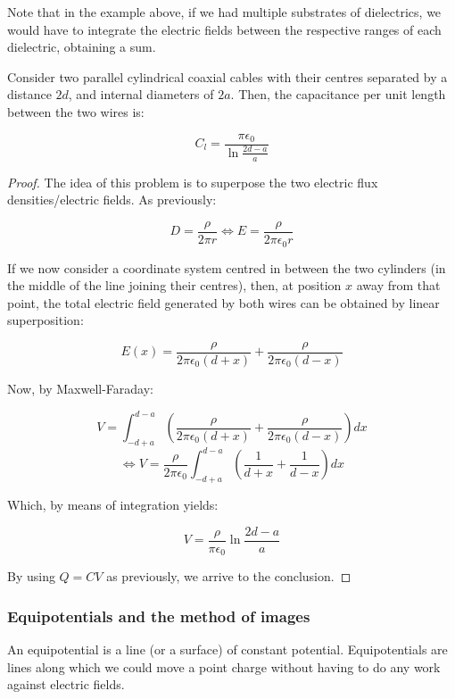 \documentclass{article}
\begin{document}
Note that in the example above, if we had multiple substrates of dielectrics, we would have to integrate the electric fields between the respective ranges of each dielectric, obtaining a sum.

\begin{proposition}
    Consider two parallel cylindrical coaxial cables with their centres separated by a distance $2d$, and internal diameters of $2a$. Then, the capacitance per unit length between the two wires is:

    \[ C_l = \frac{\pi\epsilon_0}{\ln{\frac{2d - a}{a}}} \]
\end{proposition}

\begin{proof}
    The idea of this problem is to superpose the two electric flux densities/electric fields. As previously:

    \[ D = \frac{\rho}{2\pi r} \iff E = \frac{\rho}{2\pi\epsilon_0 r} \]

    If we now consider a coordinate system centred in between the two cylinders (in the middle of the line joining their centres), then, at position $x$ away from that point, the total electric field generated by both wires can be obtained by linear superposition:

    \[ E(x) = \frac{\rho}{2\pi\epsilon_0(d+x)} + \frac{\rho}{2\pi\epsilon_0(d - x)} \]

    Now, by Maxwell-Faraday:

    \[ V = \int_{-d + a}^{d - a} \left(\frac{\rho}{2\pi\epsilon_0(d+x)} + \frac{\rho}{2\pi\epsilon_0(d - x)}\right)dx \]
    \[ \iff V = \frac{\rho}{2\pi\epsilon_0}\int_{-d + a}^{d - a}\left(\frac{1}{d+x} + \frac{1}{d-x}\right)dx \]

    Which, by means of integration yields:

    \[ V = \frac{\rho}{\pi \epsilon_0}\ln{\frac{2d - a}{a}} \]

    By using $Q = CV$ as previously, we arrive to the conclusion.
\end{proof}

\subsubsection{Equipotentials and the method of images}

\begin{definition}[Equipotential]
    An equipotential is a line (or a surface) of constant potential. Equipotentials are lines along which we could move a point charge without having to do any work against electric fields.
\end{definition}
\end{document}
